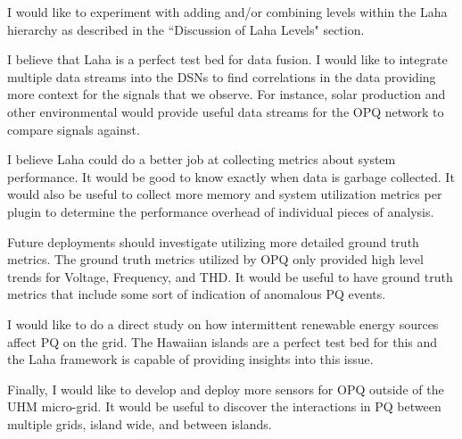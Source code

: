 I would like to experiment with adding and/or combining levels within the Laha hierarchy as described in the ``Discussion of Laha Levels" section.

I believe that Laha is a perfect test bed for data fusion. I would like to integrate multiple data streams into the DSNs to find correlations in the data providing more context for the signals that we observe. For instance, solar production and other environmental would provide useful data streams for the OPQ network to compare signals against.

I believe Laha could do a better job at collecting metrics about system performance. It would be good to know exactly when data is garbage collected. It would also be useful to collect more memory and system utilization metrics per plugin to determine the performance overhead of individual pieces of analysis.

Future deployments should investigate utilizing more detailed ground truth metrics. The ground truth metrics utilized by OPQ only provided high level trends for Voltage, Frequency, and THD. It would be useful to have ground truth metrics that include some sort of indication of anomalous PQ events.

I would like to do a direct study on how intermittent renewable energy sources affect PQ on the grid. The Hawaiian islands are a perfect test bed for this and the Laha framework is capable of providing insights into this issue.

Finally, I would like to develop and deploy more sensors for OPQ outside of the UHM micro-grid. It would be useful to discover the interactions in PQ between multiple grids, island wide, and between islands.

